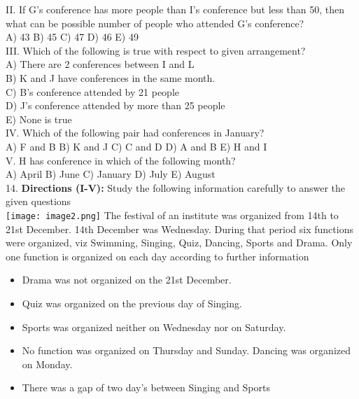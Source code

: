 \documentclass[
]{article}
\begin{document}
II. If G’s conference has more people than I’s conference but less than 50, then what can be
possible number of people who attended G’s conference?\\
A) 43 \hspace{2mm}B) 45 \hspace{2mm}C) 47 \hspace{2mm}D) 46 \hspace{2mm}E) 49\\

III. Which of the following is true with respect to given arrangement?\\
A) There are 2 conferences between I and L\\
B) K and J have conferences in the same month.\\
C) B’s conference attended by 21 people\\
D) J’s conference attended by more than 25 people\\
E) None is true\\

IV. Which of the following pair had conferences in January?\\
A) F and B \hspace{2mm}B) K and J \hspace{2mm}C) C and D \hspace{2mm}D) A and B \hspace{2mm}E) H and I\\

V. H has conference in which of the following month?\\
A) April \hspace{2mm}B) June \hspace{2mm}C) January \hspace{2mm}D) July \hspace{2mm}E) August\\

14. \textbf{Directions (I-V):} Study the following information carefully to answer the given questions\\
\texttt{[image: image2.png]}
The festival of an institute was organized from 14th to 21st December. 14th December was
Wednesday. During that period six functions were organized, viz Swimming, Singing, Quiz,
Dancing, Sports and Drama. Only one function is organized on each day according to
further information\\
\begin{itemize}
    \item Drama was not organized on the 21st December.
\item Quiz was organized on the previous day of Singing.
\item Sports was organized neither on Wednesday nor on Saturday.
\item No function was organized on Thursday and Sunday. Dancing was organized on
Monday.
\item There was a gap of two day’s between Singing and Sports
\end{itemize}
\end{document}
